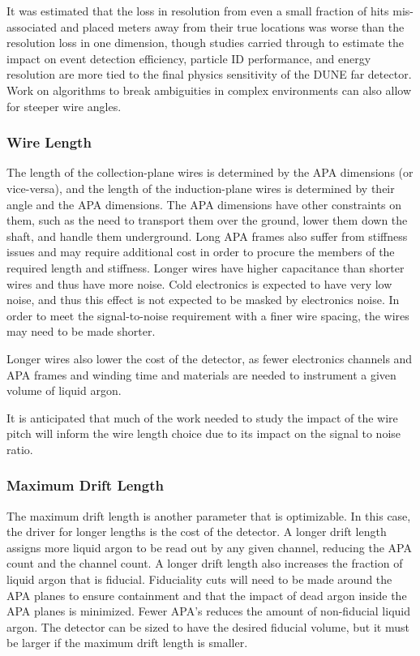 It was estimated that the loss in resolution from even a small
fraction of hits mis-associated and placed meters away from their true
locations was worse than the resolution loss in one
dimension\cite{docdb-8981}, though studies carried through to
estimate the impact on event detection efficiency, particle ID
performance, and energy resolution are more tied to the final physics
sensitivity of the DUNE far detector.  Work on algorithms to break
ambiguities in complex environments can also allow for steeper wire
angles.

\subsubsection{Wire Length}

The length of the collection-plane wires is determined by the APA dimensions (or vice-versa),
and the length of the induction-plane wires is determined by their angle and the APA
dimensions.  The APA dimensions have other constraints on them, such as the need to transport
them over the ground, lower them down the shaft, and handle them underground.  Long APA frames
also suffer from stiffness issues and may require additional cost in order to procure the
members of the required length and stiffness.  Longer wires have higher capacitance than shorter
wires and thus have more noise.  Cold electronics is expected to have very low noise, and thus
this effect is not expected to be masked by electronics noise.  In order to meet the signal-to-noise
requirement with a finer wire spacing, the wires may need to be made shorter.

Longer wires also lower the cost of the detector, as fewer electronics channels and APA frames
and winding time and materials are needed to instrument a given volume of liquid argon.

It is anticipated that much of the work needed to study the impact of the wire pitch will inform
the wire length choice due to its impact on the signal to noise ratio.

\subsubsection{Maximum Drift Length}

The maximum drift length is another parameter that is optimizable.  In
this case, the driver for longer lengths is the cost of the detector.
A longer drift length assigns more liquid argon to be read out by any
given channel, reducing the APA count and the channel count.  A longer
drift length also increases the fraction of liquid argon that is
fiducial.  Fiduciality cuts will need to be made around the APA planes
to ensure containment and that the impact of dead argon inside the APA
planes is minimized.  Fewer APA's reduces the amount of non-fiducial
liquid argon.  The detector can be sized to have the desired fiducial
volume, but it must be larger if the maximum drift length is smaller.

